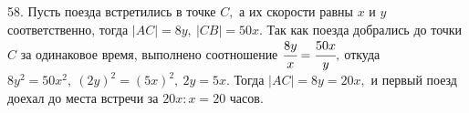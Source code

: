58. Пусть поезда встретились в точке $C,$ а их скорости равны $x$ и $y$ соответственно, тогда $|AC|=8y,\ |CB|=50x.$ Так как поезда добрались до точки $C$ за одинаковое время, выполнено соотношение $\cfrac{8y}{x}=\cfrac{50x}{y},$ откуда $8y^2=50x^2,\ (2y)^2=(5x)^2,\ 2y=5x.$ Тогда $|AC|=8y=20x,$ и первый поезд доехал до места встречи за $20x:x=20$ часов.\\
